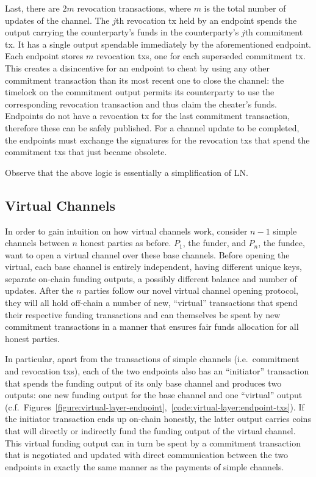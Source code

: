   Last, there are $2m$ revocation transactions, where $m$ is the total number of
  updates of the channel. The $j$th revocation tx held by an endpoint spends the
  output carrying the counterparty's funds in the counterparty's $j$th
  commitment tx. It has a single output spendable immediately by the
  aforementioned endpoint. Each endpoint stores $m$ revocation txs, one for each
  superseded commitment tx. This creates a disincentive for an endpoint to cheat
  by using any other commitment transaction than its most recent one to close
  the channel: the timelock on the commitment output permits its counterparty to
  use the corresponding revocation transaction and thus claim the cheater's
  funds.  Endpoints do not have a revocation tx for the last commitment
  transaction, therefore these can be safely published. For a channel update to
  be completed, the endpoints must exchange the signatures for the revocation
  txs that spend the commitment txs that just became obsolete.

  Observe that the above logic is essentially a simplification of LN.

\subsection{Virtual Channels}
  In order to gain intuition on how virtual channels work, consider $n-1$
  simple channels between $n$ honest parties as before. $P_1$, the
  funder, and $P_n$, the fundee, want to open a virtual channel over these base
  channels.
  Before opening the virtual, each base channel is entirely independent, having
  different unique keys, separate on-chain funding outputs, a possibly different
  balance and number of updates. After the $n$ parties follow our novel virtual
  channel opening protocol, they will all hold off-chain a number of new,
  ``virtual'' transactions that spend their respective funding transactions and
  can themselves be spent by new commitment transactions in a manner that
  ensures fair funds allocation for all honest parties.

  In particular, apart from the transactions of simple channels (i.e.\
  commitment and revocation txs), each of the two
  endpoints also has an ``initiator'' transaction that spends the funding output
  of its only base channel and produces two outputs: one new funding output for
  the base channel and one ``virtual'' output (c.f.\
  Figures~\ref{figure:virtual-layer-endpoint},~\ref{code:virtual-layer:endpoint-txs}).
  If the initiator transaction ends up on-chain honestly, the latter output
  carries coins that will directly or indirectly fund the funding output of the
  virtual channel. This virtual funding output can in turn be spent by a
  commitment transaction that is negotiated and updated with direct
  communication between the two endpoints in exactly the same manner as the
  payments of simple channels.

